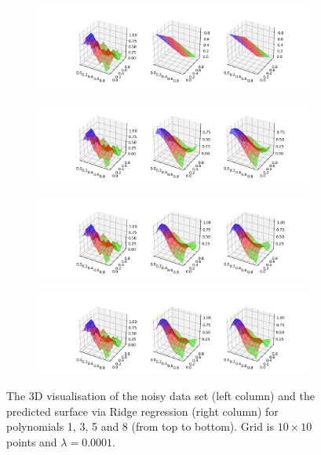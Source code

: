   \begin{figure}[!ht]
\begin{subfigure}{\textwidth}
  \centering
  \includegraphics[width=1\linewidth]{images/surf/fake_ridge_p01_n10.png}
\end{subfigure}
\begin{subfigure}{\textwidth}
  \centering
  \includegraphics[width=1\linewidth]{images/surf/fake_ridge_p03_n10.png}
\end{subfigure}
\begin{subfigure}{\textwidth}
  \centering
  \includegraphics[width=1\linewidth]{images/surf/fake_ridge_p05_n10.png}
\end{subfigure}
\begin{subfigure}{\textwidth}
  \centering
  \includegraphics[width=1\linewidth]{images/surf/fake_ridge_p08_n10.png}
\end{subfigure}
\caption{The 3D visualisation of the noisy data set (left column) and the predicted surface via Ridge regression (right column) for polynomials 1, 3, 5 and 8 (from top to bottom). Grid is $10\times10$ points and $\lambda = 0.0001$.}
\label{fig:ridge-surf1}
\end{figure}

